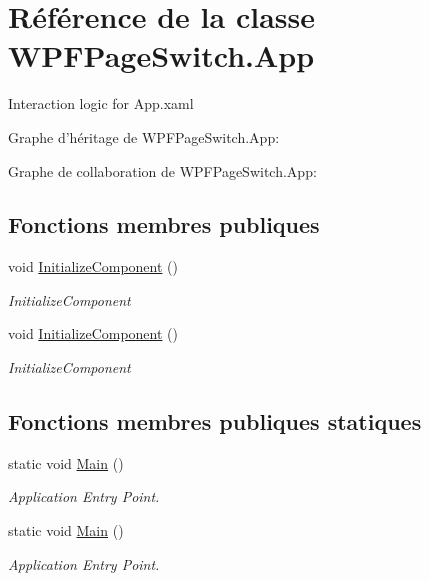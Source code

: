 \hypertarget{class_w_p_f_page_switch_1_1_app}{\section{Référence de la classe W\+P\+F\+Page\+Switch.\+App}
\label{class_w_p_f_page_switch_1_1_app}
}


Interaction logic for App.\+xaml  




Graphe d'héritage de W\+P\+F\+Page\+Switch.\+App\+:


Graphe de collaboration de W\+P\+F\+Page\+Switch.\+App\+:
\subsection*{Fonctions membres publiques}
\begin{DoxyCompactItemize}
\item 
void \hyperlink{class_w_p_f_page_switch_1_1_app_a4783f15d847a19375e68c3217d54fce3}{Initialize\+Component} ()
\begin{DoxyCompactList}\small\item\em Initialize\+Component \end{DoxyCompactList}\item 
void \hyperlink{class_w_p_f_page_switch_1_1_app_a4783f15d847a19375e68c3217d54fce3}{Initialize\+Component} ()
\begin{DoxyCompactList}\small\item\em Initialize\+Component \end{DoxyCompactList}\end{DoxyCompactItemize}
\subsection*{Fonctions membres publiques statiques}
\begin{DoxyCompactItemize}
\item 
static void \hyperlink{class_w_p_f_page_switch_1_1_app_a6c7267c67de3c5f282b47d9606ca0f36}{Main} ()
\begin{DoxyCompactList}\small\item\em Application Entry Point. \end{DoxyCompactList}\item 
static void \hyperlink{class_w_p_f_page_switch_1_1_app_a6c7267c67de3c5f282b47d9606ca0f36}{Main} ()
\begin{DoxyCompactList}\small\item\em Application Entry Point. \end{DoxyCompactList}\end{DoxyCompactItemize}



